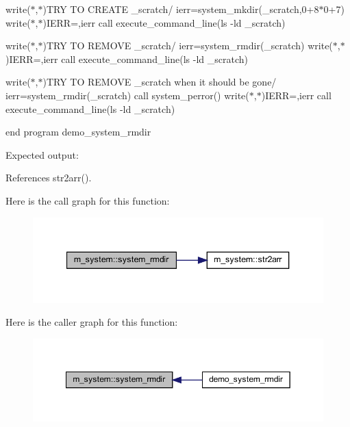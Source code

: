 write($\ast$,$\ast$)\textquotesingle{}T\+RY TO C\+R\+E\+A\+TE \+\_\+scratch/\textquotesingle{} ierr=system\+\_\+mkdir(\textquotesingle{}\+\_\+scratch\textquotesingle{},0+8$\ast$0+7) write($\ast$,$\ast$)\textquotesingle{}I\+E\+RR=\textquotesingle{},ierr call execute\+\_\+command\+\_\+line(\textquotesingle{}ls -\/ld \+\_\+scratch\textquotesingle{})

write($\ast$,$\ast$)\textquotesingle{}T\+RY TO R\+E\+M\+O\+VE \+\_\+scratch/\textquotesingle{} ierr=system\+\_\+rmdir(\textquotesingle{}\+\_\+scratch\textquotesingle{}) write($\ast$,$\ast$)\textquotesingle{}I\+E\+RR=\textquotesingle{},ierr call execute\+\_\+command\+\_\+line(\textquotesingle{}ls -\/ld \+\_\+scratch\textquotesingle{})

write($\ast$,$\ast$)\textquotesingle{}T\+RY TO R\+E\+M\+O\+VE \+\_\+scratch when it should be gone/\textquotesingle{} ierr=system\+\_\+rmdir(\textquotesingle{}\+\_\+scratch\textquotesingle{}) call system\+\_\+perror(\textquotesingle{}) write($\ast$,$\ast$)\textquotesingle{}I\+E\+RR=\textquotesingle{},ierr call execute\+\_\+command\+\_\+line(\textquotesingle{}ls -\/ld \+\_\+scratch\textquotesingle{})

end program demo\+\_\+system\+\_\+rmdir

Expected output\+: 

References str2arr().

Here is the call graph for this function\+:
\nopagebreak
\begin{figure}[H]
\begin{center}
\leavevmode
\includegraphics[width=340pt]{namespacem__system_a21fd3e1ccd50cef6adc539ef3d7a9836_cgraph}
\end{center}
\end{figure}
Here is the caller graph for this function\+:
\nopagebreak
\begin{figure}[H]
\begin{center}
\leavevmode
\includegraphics[width=349pt]{namespacem__system_a21fd3e1ccd50cef6adc539ef3d7a9836_icgraph}
\end{center}
\end{figure}
\mbox{\label{namespacem__system_a04fd02e6f5ce2f8ecdfb577e1490feba}} 
